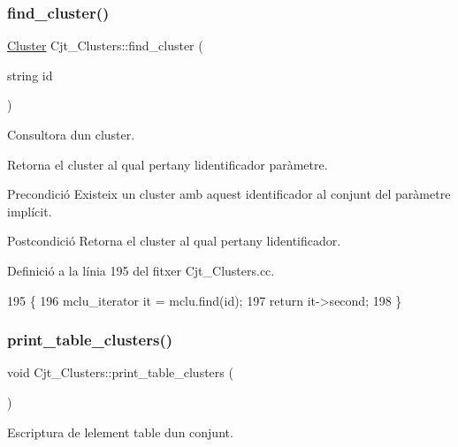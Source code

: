 \subsubsection{\texorpdfstring{find\+\_\+cluster()}{find\_cluster()}}
{\footnotesize\ttfamily \hyperlink{class_cluster}{Cluster} Cjt\+\_\+\+Clusters\+::find\+\_\+cluster (\begin{DoxyParamCaption}\item[{string}]{id }\end{DoxyParamCaption})}



Consultora d\textquotesingle{}un cluster. 

Retorna el cluster al qual pertany l\textquotesingle{}identificador paràmetre.

\begin{DoxyPrecond}{Precondició}
Existeix un cluster amb aquest identificador al conjunt del paràmetre implícit. 
\end{DoxyPrecond}
\begin{DoxyPostcond}{Postcondició}
Retorna el cluster al qual pertany l\textquotesingle{}identificador. 
\end{DoxyPostcond}


Definició a la línia 195 del fitxer Cjt\+\_\+\+Clusters.\+cc.


\begin{DoxyCode}
195                                             \{
196     mclu\_iterator it = mclu.find(\textcolor{keywordtype}{id});
197     \textcolor{keywordflow}{return} it->second;
198 \}
\end{DoxyCode}
\mbox{\label{class_cjt___clusters_acc4dd33e82c36c394acd44e60f77da22}} 
\subsubsection{\texorpdfstring{print\+\_\+table\+\_\+clusters()}{print\_table\_clusters()}}
{\footnotesize\ttfamily void Cjt\+\_\+\+Clusters\+::print\+\_\+table\+\_\+clusters (\begin{DoxyParamCaption}{ }\end{DoxyParamCaption})}



Escriptura de l\textquotesingle{}element table d\textquotesingle{}un conjunt. 


